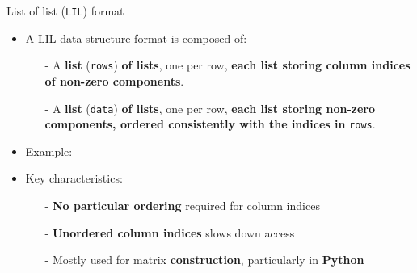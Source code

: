 \documentclass[t,usepdftitle=false]{beamer}
\begin{document}
\begin{frame}{List of list (\texttt{LIL}) format}
\begin{itemize}
\item A LIL data structure format is composed of:
\begin{itemize}\normalsize
\item[-] A \textbf{list} (\texttt{rows}) \textbf{of lists}, one per row, \textbf{each list storing column indices of non-zero components}.
\item[-] A \textbf{list} (\texttt{data}) \textbf{of lists}, one per row, \textbf{each list storing non-zero components, ordered consistently with the indices in} \texttt{rows}.
\end{itemize}
\item Example:\vspace{-.65cm}\\
\hspace*{-.2cm}\begin{minipage}[t]{0.99\textwidth}
\end{minipage}\vspace{.1cm}
\item Key characteristics:
\begin{itemize}\normalsize
\item[-] \textbf{No particular ordering} required for column indices
\item[-] \textbf{Unordered column indices} slows down access
\item[-] Mostly used for matrix \textbf{construction}, particularly in \textbf{Python}
\end{itemize}
\end{itemize}
\end{frame}
\end{document}
